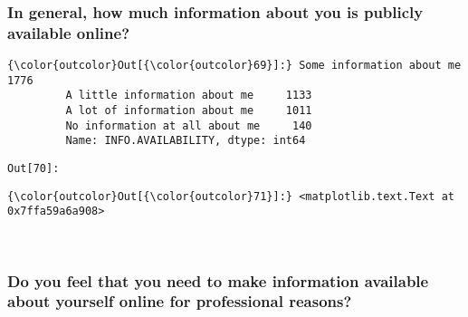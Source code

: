 \documentclass[11pt]{article}
\begin{document}
    \subsubsection{In general, how much information about you is publicly
available
online?}\label{in-general-how-much-information-about-you-is-publicly-available-online}


            \begin{Verbatim}[commandchars=\\\{\}]
{\color{outcolor}Out[{\color{outcolor}69}]:} Some information about me         1776
         A little information about me     1133
         A lot of information about me     1011
         No information at all about me     140
         Name: INFO.AVAILABILITY, dtype: int64
\end{Verbatim}
        
\texttt{\color{outcolor}Out[{\color{outcolor}70}]:}
    

    


            \begin{Verbatim}[commandchars=\\\{\}]
{\color{outcolor}Out[{\color{outcolor}71}]:} <matplotlib.text.Text at 0x7ffa59a6a908>
\end{Verbatim}
        
    \begin{center}
    \end{center}
    { \hspace*{\fill} \\}
    
    \subsubsection{Do you feel that you need to make information available
about yourself online for professional
reasons?}\label{do-you-feel-that-you-need-to-make-information-available-about-yourself-online-for-professional-reasons}
\end{document}
